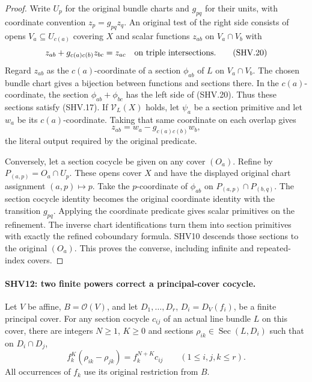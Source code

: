 \begin{proof}
Write $U_p$ for the original bundle charts and $g_{pq}$ for
their units, with coordinate convention $z_p=g_{pq}z_q$.
An original test of the right side consists of opens
$V_a\subseteq U_{c(a)}$ covering $X$ and scalar functions
$z_{ab}$ on $V_a\cap V_b$ with
\[
 z_{ab}+g_{c(a)c(b)}z_{bc}=z_{ac}
                    \quad\hbox{on triple intersections}.
                                                        \tag{SHV.20}
\]
Regard $z_{ab}$ as the $c(a)$-coordinate of a section
$\phi_{ab}$ of $L$ on $V_a\cap V_b$.  The chosen bundle
chart gives a bijection between functions and sections there.
In the $c(a)$-coordinate, the section
$\phi_{ab}+\phi_{bc}$ has the left side of (SHV.20).
Thus these sections satisfy (SHV.17).
If $\mathcal V_L(X)$ holds, let $\psi_a$ be a section primitive
and let $w_a$ be its $c(a)$-coordinate.  Taking that same
coordinate on each overlap gives
\[
             z_{ab}=w_a-g_{c(a)c(b)}w_b,
                                                        \tag{SHV.21}
\]
the literal output required by the original predicate.

Conversely, let a section cocycle be given on any cover $(O_a)$.
Refine by $P_{(a,p)}=O_a\cap U_p$.  These opens cover $X$
and have the displayed original chart assignment $(a,p)\mapsto p$.
Take the $p$-coordinate of $\phi_{ab}$ on
$P_{(a,p)}\cap P_{(b,q)}$.  The section cocycle identity becomes
the original coordinate identity with the transition $g_{pq}$.
Applying the coordinate predicate gives scalar primitives on the
refinement.  The inverse chart identifications turn them into
section primitives with exactly the refined coboundary formula.
SHV10 descends those sections to the original $(O_a)$.
This proves the converse, including infinite and repeated-index
covers.
\end{proof}

\paragraph{SHV12: two finite powers correct a principal-cover cocycle.}
\label{claim:SHV12}
Let $V$ be affine, $B=\mathcal O(V)$, and let
$D_1,\ldots,D_r$, $D_i=D_V(f_i)$, be a finite principal cover.
For any section cocycle $c_{ij}$ of an actual line bundle $L$
on this cover, there are integers $N\ge1$, $K\ge0$ and sections
$\rho_{ik}\in\operatorname{Sec}(L,D_i)$ such that on
$D_i\cap D_j$,
\[
 f_k^K(\rho_{ik}-\rho_{jk})=f_k^{N+K}c_{ij}
                    \qquad(1\le i,j,k\le r).
                                                        \tag{SHV.22}
\]
All occurrences of $f_k$ use its original restriction from $B$.

